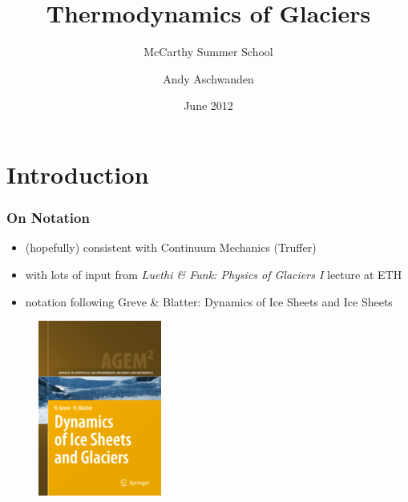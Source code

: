 \documentclass[hide notes,intlimits,handout]{beamer}
\title[Glacier Thermodynamics] %
{Thermodynamics of Glaciers}
\subtitle{McCarthy Summer School}
\author[Aschwanden] %
{Andy Aschwanden}
\institute[ARSC] %
{
  Arctic Region Supercomputing Center\\
  University of Alaska Fairbanks, USA
}
\date{June 2012}
\begin{document}


\begin{frame}
  \titlepage
\end{frame}



\section{Introduction}
\label{sec:introduction}

\begin{frame}
  \frametitle{On Notation}
  \begin{itemize}
  \item (hopefully) consistent with Continuum Mechanics (Truffer)
  \item with lots of input from \emph{Luethi \& Funk: Physics of Glaciers I} lecture at ETH
  \item notation following Greve \& Blatter: Dynamics of Ice Sheets and Ice Sheets
  \end{itemize}
  \begin{figure}
    \includegraphics[scale=1.25]{figures/greveblatter_disg}
  \end{figure}
\end{frame}


\end{document}
